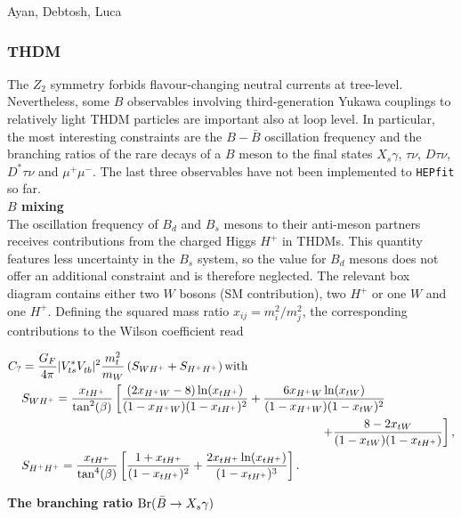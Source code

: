 \documentclass[preprint,3p,12pt]{elsarticle}
\newcommand{\HEPfit}{\texttt{HEPfit}\xspace}
\begin{document}
{Ayan, Debtosh, Luca

\subsubsection{THDM}

The $Z_2$ symmetry forbids flavour-changing neutral currents at tree-level. Nevertheless, some $B$ observables involving third-generation Yukawa couplings to relatively light THDM particles are important also at loop level. In particular, the most interesting constraints are the $B-\bar{B}$ oscillation frequency and the branching ratios of the rare decays of a $B$ meson to the final states $X_s \gamma$, $\tau \nu$, $D \tau \nu$, $D^* \tau \nu$ and $\mu^+\mu^-$. The last three observables have not been implemented to \HEPfit so far.\\

\textbf{$B$ mixing}\\

The oscillation frequency of $B_d$ and $B_s$ mesons to their anti-meson partners receives contributions from the charged Higgs $H^+$ in THDMs. This quantity features less uncertainty in the $B_s$ system, so the value for $B_d$ mesons does not offer an additional constraint and is therefore neglected. The relevant box diagram contains either two $W$ bosons (SM contribution), two $H^+$ or one $W$ and one $H^+$. Defining the squared mass ratio $x_{ij}=m_i^2/m_j^2$, the corresponding contributions to the Wilson coefficient read \cite{Geng:1988bq,Deschamps:2009rh}

\begin{align}
C_?&=\frac{G_F}{4\pi} |V_{ts}^*V_{tb}^{\phantom{*}}|^2 \frac{m_t^2}{m_W} \left( S_{WH^+}+S_{H^+H^+}\right)
\text{with} \nonumber \\
&S_{WH^+}=\frac{x_{tH^+}}{\tan^2(\beta)}\left[ \frac{(2x_{H^+W}-8)\ln (x_{tH^+})}{(1-x_{H^+W})(1-x_{tH^+})^2} +\frac{6x_{H^+W}\ln (x_{tW})}{(1-x_{H^+W})(1-x_{tW})^2} \right. \nonumber \\
&\hspace*{250pt} \left. +\frac{8-2x_{tW}}{(1-x_{tW})(1-x_{tH^+})}\right] ,\nonumber \\
&S_{H^+H^+}=\frac{x_{tH^+}}{\tan^4(\beta)}\left[ \frac{1+x_{tH^+}}{(1-x_{tH^+})^2} +\frac{2x_{tH^+}\ln (x_{tH^+})}{(1-x_{tH^+})^3} \right] .\nonumber
\end{align}

\textbf{The branching ratio ${\rm Br}(\bar{B}\to X_s\gamma)$}\\

}
\end{document}
